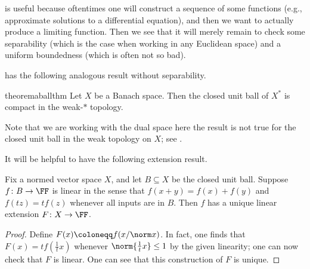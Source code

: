 \documentclass[../notes.tex]{subfiles}
\begin{document}
\begin{remark}
	 is useful because oftentimes one will construct a sequence of some functions (e.g., approximate solutions to a differential equation), and then we want to actually produce a limiting function. Then we see that it will merely remain to check some separability (which is the case when working in any Euclidean space) and a uniform boundedness (which is often not so bad).
\end{remark}
 has the following analogous result without separability.
\begin{restatable}[Alaoglu]{theorem}{aballthm} \label{thm:alaoglu-ball-weak-compact}
	Let $X$ be a Banach space. Then the closed unit ball of $X^*$ is compact in the weak-$*$ topology.
\end{restatable}
Note that we are working with the dual space here the result is not true for the closed unit ball in the weak topology on $X$; see .

It will be helpful to have the following extension result.
\begin{lemma} \label{lem:extend-from-ball}
	Fix a normed vector space $X$, and let $B\subseteq X$ be the closed unit ball. Suppose $f\colon B\to\FF$ is linear in the sense that $f(x+y)=f(x)+f(y)$ and $f(tz)=tf(z)$ whenever all inputs are in $B$. Then $f$ has a unique linear extension $F\colon X\to\FF$.
\end{lemma}
\begin{proof}
	Define $F(x)\coloneqq f(x/\norm x)$. In fact, one finds that $F(x)=tf\left(\frac1tx\right)$ whenever $\norm{\frac1tx}\le1$ by the given linearity; one can now check that $F$ is linear. One can see that this construction of $F$ is unique.
\end{proof}
\end{document}
